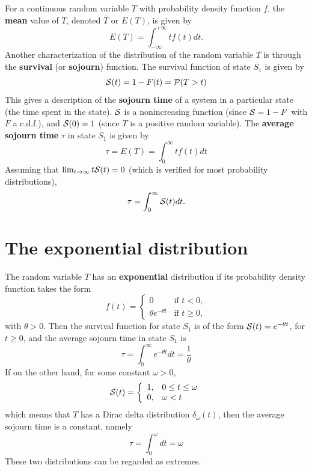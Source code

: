For a continuous random variable $T$ with probability density function $f$, the \textbf{mean} value of $T$, denoted $\bar T$ or $E(T)$, is given by
\[
E(T)=\int_{-\infty}^{+\infty} tf(t)dt.
\]
Another characterization of the distribution of the random variable
$T$ is through the \textbf{survival} (or \textbf{sojourn}) function. 
The survival function of state $S_1$ is given by 
\begin{equation}
  \S(t)=1-F(t)=\Proba{T>t}
  \label{eq:survival}
\end{equation}
This gives a description of the \textbf{sojourn time} of a
system in a particular state (the time spent in the state).
$\S$ is a nonincreasing function (since $\S=1-F$
with $F$ a c.d.f.), and
$\S(0)=1$ (since $T$ is a positive random variable).
The \textbf{average sojourn time} $\tau$ in state $S_1$ is given by
\[
\tau=E(T)=\int_0^\infty tf(t)dt
\]
Assuming that $\lim_{t\to\infty}t\S(t)=0$ (which is verified
for most probability distributions), 
\[
\tau=\int_0^\infty \S(t)dt.
\]



\section{The exponential distribution}

The random variable $T$ has an \textbf{exponential} distribution if its probability density function takes the form
\begin{equation}\label{eq:exp_distrib}
f(t)=\begin{cases}0&\textrm{if }t<0,\\
\theta e^{-\theta t}&\textrm{if }t\geq 0,
\end{cases}
\end{equation}
with $\theta>0$. Then the
survival function for state $S_1$ is of the form $\S(t)=e^{-\theta
  t}$, for $t\geq 0$, and the average sojourn time in state $S_1$ is
\[
\tau=\int_0^\infty e^{-\theta t}dt=\frac 1\theta
\]
If on the other hand, for some constant $\omega>0$,
\[
\S(t)=
\left\{
\begin{array}{ll}
1, & 0\leq t\leq\omega \\
0, & \omega<t
\end{array}
\right.
\]
which means that $T$ has a Dirac delta distribution
$\delta_\omega(t)$, then the average sojourn time is a constant, namely
\[
\tau=\int_0^\omega dt=\omega
\]
These two distributions can be regarded as extremes.



